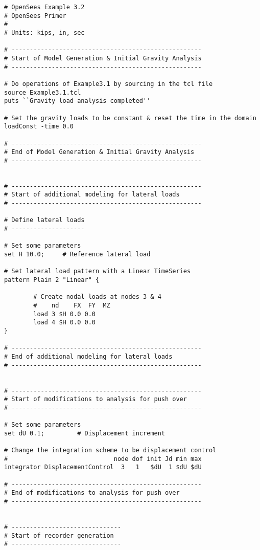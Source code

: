 \documentclass[12pt]{article}
\begin{document}
\vspace{0.2in} 
{\sf\small
\begin{verbatim}
# OpenSees Example 3.2
# OpenSees Primer
#
# Units: kips, in, sec

# ----------------------------------------------------
# Start of Model Generation & Initial Gravity Analysis
# ----------------------------------------------------

# Do operations of Example3.1 by sourcing in the tcl file
source Example3.1.tcl
puts ``Gravity load analysis completed''

# Set the gravity loads to be constant & reset the time in the domain
loadConst -time 0.0

# ----------------------------------------------------
# End of Model Generation & Initial Gravity Analysis
# ----------------------------------------------------


# ----------------------------------------------------
# Start of additional modeling for lateral loads
# ----------------------------------------------------

# Define lateral loads
# --------------------

# Set some parameters
set H 10.0;		# Reference lateral load

# Set lateral load pattern with a Linear TimeSeries
pattern Plain 2 "Linear" {

        # Create nodal loads at nodes 3 & 4
        #    nd    FX  FY  MZ 
        load 3 $H 0.0 0.0 
        load 4 $H 0.0 0.0 
}

# ----------------------------------------------------
# End of additional modeling for lateral loads
# ----------------------------------------------------


# ----------------------------------------------------
# Start of modifications to analysis for push over
# ----------------------------------------------------

# Set some parameters
set dU 0.1;	        # Displacement increment

# Change the integration scheme to be displacement control
#                             node dof init Jd min max
integrator DisplacementControl  3   1   $dU  1 $dU $dU

# ----------------------------------------------------
# End of modifications to analysis for push over
# ----------------------------------------------------


# ------------------------------
# Start of recorder generation
# ------------------------------


\end{verbatim}}
\end{document}
